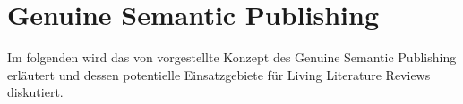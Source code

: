 \section{Genuine Semantic Publishing}
\label{sec:genuine-semantic-publishing}

Im folgenden wird das von \citet{kuhn2017genuine} vorgestellte Konzept des Genuine Semantic Publishing erläutert und dessen potentielle Einsatzgebiete für Living Literature Reviews diskutiert.